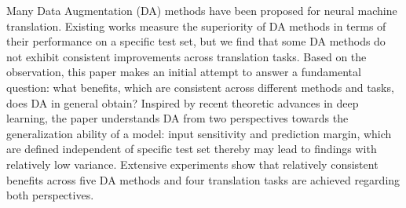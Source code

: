 Many Data Augmentation (DA) methods have been proposed for neural machine translation.
Existing works measure the superiority of DA methods in terms of their performance on a specific test set, but we find that some DA methods do not exhibit consistent improvements across translation tasks. Based on the observation, this paper makes an initial attempt to answer a fundamental question: what benefits, which are consistent across different methods and tasks, does DA in general obtain? Inspired by recent theoretic advances in deep learning, the paper understands DA from two perspectives towards the generalization ability of a model: input sensitivity and prediction margin, which are defined independent of specific test set thereby may lead to findings with relatively low variance. Extensive experiments show that relatively consistent benefits across five DA methods and four translation tasks are achieved regarding both perspectives.